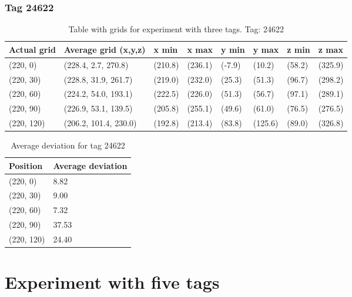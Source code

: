 \subsubsection{Tag 24622}
\begin{table}[H] 
    \centering
    \begin{tabular}{|l|l|l|l|l|l|l|l|}
        \hline
        Actual grid & Average grid (x,y,z)   & x min   & x max   & y min    & y max   & z min   & z max    \\ \hline
        (220, 0)     & (228.4, 2.7, 270.8)      & (210.8)     & (236.1)    & (-7.9)     & (10.2)      & (58.2)     & (325.9)    \\ \hline
        (220, 30)     & (228.8, 31.9, 261.7)      & (219.0)     & (232.0)    & (25.3)     & (51.3)      & (96.7)     & (298.2)    \\ \hline
        (220, 60)     & (224.2, 54.0, 193.1)      & (222.5)     & (226.0)    & (51.3)     & (56.7)      & (97.1)     & (289.1)    \\ \hline
        (220, 90)     & (226.9, 53.1, 139.5)      & (205.8)     & (255.1)    & (49.6)     & (61.0)      & (76.5)     & (276.5)    \\ \hline
        (220, 120)     & (206.2, 101.4, 230.0)      & (192.8)     & (213.4)    & (83.8)     & (125.6)      & (89.0)     & (326.8)    \\ \hline
    \end{tabular}
    \caption{Table with grids for experiment with three tags. Tag: 24622}
    \label{Tab:three-tag-experiment-result-tag-24622}
\end{table}

\begin{table}[]
    \centering
    \begin{tabular}{|l|l|}
    \hline
    Position   & Average deviation \\ \hline
    (220, 0)   & 8.82              \\ \hline
    (220, 30)  & 9.00              \\ \hline
    (220, 60)  & 7.32              \\ \hline
    (220, 90)  & 37.53             \\ \hline
    (220, 120) & 24.40             \\ \hline
    \end{tabular}
\caption{Average deviation for tag 24622}
\end{table}

\section{Experiment with five tags}

